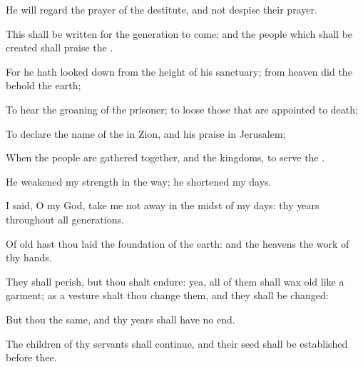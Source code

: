 {\par }{\Q {}He will
regard the
prayer of the
destitute, and not
despise their
prayer.
\par }{\Q {}This shall be
written for the
generation to
come: and the
people which shall be
created shall
praise the
{}.
\par }{\Q {}For he hath looked
down from the
height of his
sanctuary; from
heaven did the
{}
behold the
earth;
\par }{\Q {}To
hear the
groaning of the
prisoner; to
loose those that are
appointed to
death;
\par }{\Q {}To
declare the
name of the
{} in
Zion, and his
praise in
Jerusalem;
\par }{\Q {}When the
people are
gathered
together, and the
kingdoms, to
serve the
{}.
\par }{\BB \par }{\Q {}He
weakened my
strength in the
way; he
shortened my
days.
\par }{\Q {}I
said, O my
God, take me not
away in the
midst of my
days: thy
years
{} throughout
all
generations.
\par }{\Q {}Of
old hast thou laid the
foundation of the
earth: and the
heavens
{} the
work of thy
hands.
\par }{\Q {}They shall
perish, but thou shalt
endure: yea, all of them shall wax
old like a
garment; as a
vesture shalt thou
change them, and they shall be
changed:
\par }{\Q {}But thou
{} the same, and thy
years shall have no
end.
\par }{\Q {}The
children of thy
servants shall
continue, and their
seed shall be
established
before thee.

}
